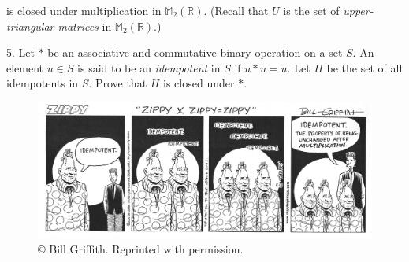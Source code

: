 \documentclass[10pt,openany,oneside]{book}
\theoremstyle{plain}
\theoremstyle{definition}
\theoremstyle{definition}
\theoremstyle{definition}
\theoremstyle{definition}
\numberwithin{equation}{section}
\def\R{\mathbb{R}}
\def\M{\mathbb{M}}
\begin{document}
\begin{exerciselist}
\begin{enumerate}[label=(\alph*)]
\begin{equation*}
\end{equation*}
is closed under multiplication in \(\M_2(\R)\). (Recall that \(U\) is  the set of \emph{upper-triangular matrices} in \(\M_2(\R)\).)%
\end{enumerate}
%
\par\smallskip
\item[5.]\hypertarget{exercise-11}{}Let \(*\) be an associative and commutative binary operation on a set \(S\). An element \(u\in S\) is said to be an \emph{idempotent} in \(S\) if \(u*u=u\). Let \(H\) be the set of all idempotents in \(S\). Prove that \(H\) is closed under \(*\).%
\begin{figure}
\centering
\includegraphics[width=1\linewidth]{zippy.png}
\caption{©  Bill Griffith. Reprinted with permission.\label{zip}}
\end{figure}
\par\smallskip
\end{exerciselist}
\typeout{************************************************}
\typeout{************************************************}
\end{document}
